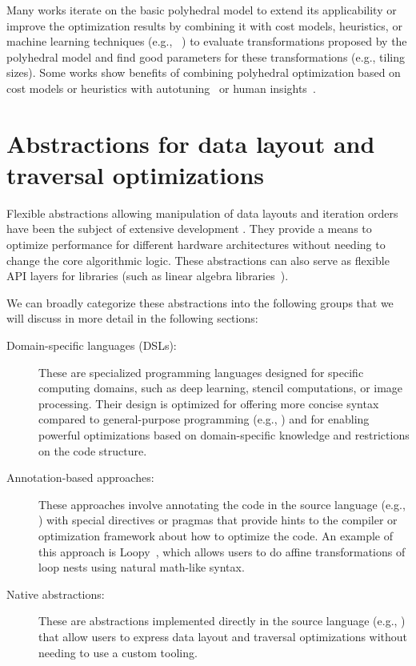 Many works iterate on the basic polyhedral model to extend its applicability or improve the optimization results by combining it with cost models, heuristics, or machine learning techniques (e.g., \citeauthor{baghdadi2021deep}~\cite{baghdadi2021deep}) to evaluate transformations proposed by the polyhedral model and find good parameters for these transformations (e.g., tiling sizes). Some works show benefits of combining polyhedral optimization based on cost models or heuristics with autotuning~\cite{chelini2020automatic} or human insights~\cite{zinenko2014clint,bagneres2016opening}.


\section{Abstractions for data layout and traversal optimizations}\label{sec:abstractions}

Flexible abstractions allowing manipulation of data layouts and iteration orders have been the subject of extensive development . They provide a means to optimize performance for different hardware architectures without needing to change the core algorithmic logic.
These abstractions can also serve as flexible API layers for libraries (such as linear algebra libraries~\cite{whaley1998automatically}).

We can broadly categorize these abstractions into the following groups that we will discuss in more detail in the following sections:

\begin{description}
  \item[Domain-specific languages (DSLs):]\label{des:dsl} These are specialized programming languages designed for specific computing domains, such as deep learning, stencil computations, or image processing. Their design is optimized for offering more concise syntax compared to general-purpose programming (e.g., \cpp) and for enabling powerful optimizations based on domain-specific knowledge and restrictions on the code structure.
  \item[Annotation-based approaches:]\label{des:annotation} These approaches involve annotating the code in the source language (e.g., \cpp) with special directives or pragmas that provide hints to the compiler or optimization framework about how to optimize the code. An example of this approach is Loopy~\cite{namjoshi2016loopy}, which allows users to do affine transformations of loop nests using natural math-like syntax.
  \item[Native abstractions:]\label{des:native} These are abstractions implemented directly in the source language (e.g., \cpp) that allow users to express data layout and traversal optimizations without needing to use a custom tooling. 
\end{description}

